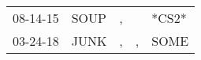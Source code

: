 \begin{supertabular}{lllll}
 08-14-15 &  SOUP &  , &    &  *CS2* \\
 03-24-18 &  JUNK &  , &  , &   SOME \\
\end{supertabular}
